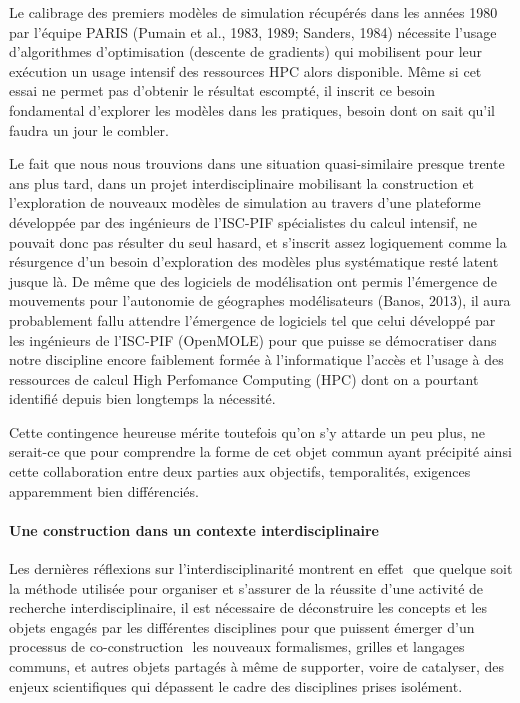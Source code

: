 Le calibrage  des premiers modèles de simulation récupérés dans les années 1980 par l'équipe PARIS (Pumain et al., 1983, 1989; Sanders, 1984)⁠ nécessite l'usage d'algorithmes d'optimisation (descente de gradients) qui mobilisent pour leur exécution un usage intensif des ressources HPC alors disponible. Même si cet essai ne permet pas d'obtenir le résultat escompté, il inscrit ce besoin fondamental d'explorer les modèles dans les pratiques, besoin dont on sait qu'il faudra un jour le combler. 

Le fait que nous nous trouvions dans une situation quasi-similaire presque trente ans plus tard, dans un projet interdisciplinaire mobilisant la construction et l'exploration de nouveaux modèles de simulation au travers d'une plateforme développée par des ingénieurs de l'ISC-PIF spécialistes du calcul intensif, ne pouvait donc pas résulter du seul hasard, et s'inscrit assez logiquement comme la résurgence d'un besoin d'exploration des modèles plus systématique resté latent jusque là. De même que des logiciels de modélisation ont permis l'émergence de mouvements pour l'autonomie de géographes modélisateurs (Banos, 2013)⁠, il aura probablement fallu attendre l'émergence de logiciels tel que celui développé par les ingénieurs de l'ISC-PIF (OpenMOLE) pour que puisse se démocratiser dans notre discipline encore faiblement formée à l'informatique l'accès et l'usage à des ressources de calcul High Perfomance Computing (HPC) dont on a pourtant identifié depuis bien longtemps la nécessité. 

Cette contingence heureuse mérite toutefois qu'on s'y attarde un peu plus, ne serait-ce que pour comprendre la forme de cet objet commun ayant précipité ainsi cette collaboration entre deux parties aux objectifs, temporalités, exigences apparemment bien différenciés. 

\paragraph*{Une construction dans un contexte interdisciplinaire}

Les dernières réflexions sur l'interdisciplinarité montrent en effet \autocites{Pumain2005, Chapron2014}⁠ que quelque soit la méthode utilisée pour organiser et s'assurer de la réussite d'une activité de recherche interdisciplinaire, il est nécessaire de déconstruire les concepts et les objets engagés par les différentes disciplines pour que puissent émerger d'un processus de co-construction \autocite{Banos2013}⁠ les nouveaux formalismes, grilles et langages communs, et autres objets partagés à même de supporter, voire de catalyser, des enjeux scientifiques qui dépassent le cadre des disciplines prises isolément.

